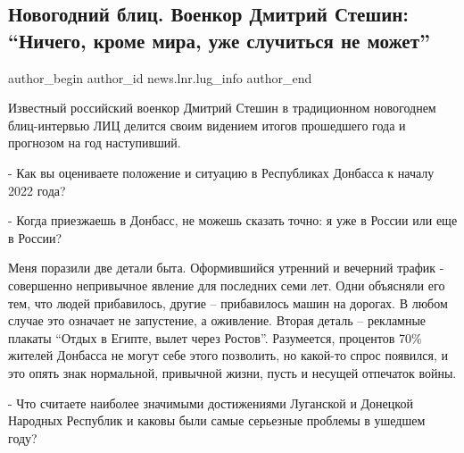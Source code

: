 
 
 
 
 
\subsection{Новогодний блиц. Военкор Дмитрий Стешин: \enquote{Ничего, кроме мира, уже случиться не может}}
\label{sec:10_01_2022.stz.news.lnr.lug_info.1.mir_donbass}

\ifcmt
 author_begin
   author_id news.lnr.lug_info
 author_end
\fi

\begin{zznagolos}
Известный российский военкор Дмитрий Стешин в традиционном новогоднем
блиц-интервью ЛИЦ делится своим видением итогов прошедшего года и прогнозом на
год наступивший.	
\end{zznagolos}

- Как вы оцениваете положение и ситуацию в Республиках Донбасса к началу 2022
года?

- Когда приезжаешь в Донбасс, не можешь сказать точно: я уже в России или еще в
России?


Меня поразили две детали быта. Оформившийся утренний и вечерний трафик -
совершенно непривычное явление для последних семи лет. Одни объясняли его тем,
что людей прибавилось, другие – прибавилось машин на дорогах. В любом случае
это означает не запустение, а оживление. Вторая деталь – рекламные плакаты
\enquote{Отдых в Египте, вылет через Ростов}. Разумеется, процентов 70\%
жителей Донбасса не могут себе этого позволить, но какой-то спрос появился, и
это опять знак нормальной, привычной жизни, пусть и несущей отпечаток войны.

- Что считаете наиболее значимыми достижениями Луганской и Донецкой Народных
Республик и каковы были самые серьезные проблемы в ушедшем году?

